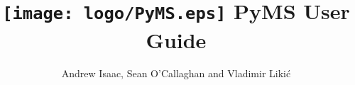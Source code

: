\documentclass[twoside,a4paper]{book}
\begin{document}
\frontmatter

\title{\texttt{[image: logo/PyMS.eps]}
\Large{PyMS User Guide}}
\author{Andrew Isaac, Sean O'Callaghan and Vladimir Liki\'{c}\\
\medskip}

\medskip



\maketitle
\tableofcontents

\mainmatter
























\backmatter
\printindex
\end{document}
